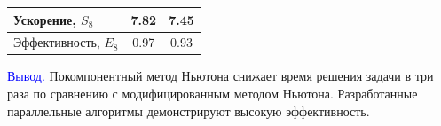 \documentclass[10pt,pdf, mathserif, hyperref={unicode}]{beamer}
\begin{document}
\begin{frame}
\begin{table}[]
\begin{tabular}{|l|c|c|}
			Ускорение, $S_8$                                                                      & 7.82                                                                                                   & 7.45                                                                                                      \\ \hline
			Эффективность, $E_8$                                                                      & 0.97                                                                                                   & 0.93                                                                                                      \\ \hline    
		\end{tabular}
	\end{table}
	{\textcolor{blue}{Вывод.}} Покомпонентный метод Ньютона снижает время решения задачи в три раза по сравнению с модифицированным методом Ньютона. Разработанные параллельные алгоритмы демонстрируют высокую эффективность.
\end{frame}
\end{document}
